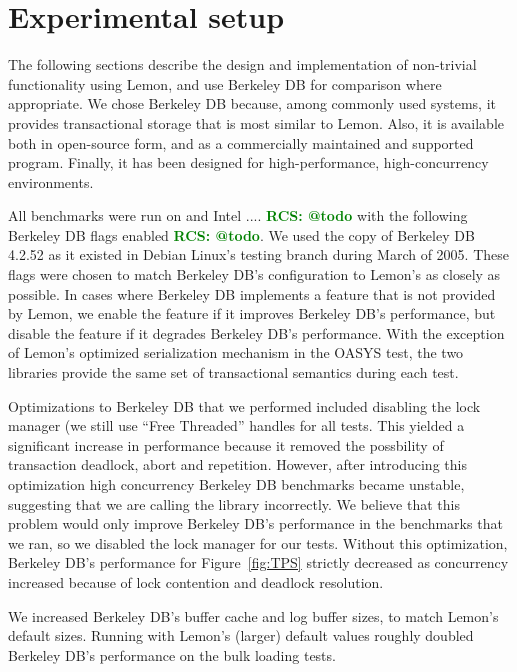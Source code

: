 \documentclass[letterpaper,twocolumn,english]{article}
\newcommand{\yad}{Lemon\xspace}
\newcommand{\rcs}[1]{\textcolor{green}{\bf RCS: #1}}
\begin{document}


\section{Experimental setup}

The following sections describe the design and implementation of
non-trivial functionality using \yad, and use Berkeley DB for
comparison where appropriate.  We chose Berkeley DB because, among
commonly used systems, it provides transactional storage that is most
similar to \yad.  Also, it is available both in open-source form, and as a
commercially maintained and supported program.  Finally, it has been 
designed for high-performance, high-concurrency environments.

All benchmarks were run on and Intel .... \rcs{@todo} with the
following Berkeley DB flags enabled \rcs{@todo}.  We used the copy
of Berkeley DB 4.2.52 as it existed in Debian Linux's testing
branch during March of 2005.  These flags were chosen to match 
Berkeley DB's configuration to \yad's as closely as possible.  In cases where
Berkeley DB implements a feature that is not provided by \yad, we
enable the feature if it improves Berkeley DB's performance, but
disable the feature if it degrades Berkeley DB's performance.  With 
the exception of \yad's optimized serialization mechanism in the 
OASYS test, the two libraries provide the same set of transactional 
semantics during each test.  

Optimizations to Berkeley DB that we performed included disabling the
lock manager (we still use ``Free Threaded'' handles for all tests.
This yielded a significant increase in performance because it removed
the possbility of transaction deadlock, abort and repetition.
However, after introducing this optimization high concurrency Berkeley
DB benchmarks became unstable, suggesting that we are calling the
library incorrectly.  We believe that this problem would only improve
Berkeley DB's performance in the benchmarks that we ran, so we
disabled the lock manager for our tests.  Without this optimization,
Berkeley DB's performance for Figure~\ref{fig:TPS} strictly decreased as
concurrency increased because of lock contention and deadlock resolution.

We increased Berkeley DB's buffer cache and log buffer sizes, to match
\yad's default sizes.  Running with \yad's (larger) default values
roughly doubled Berkeley DB's performance on the bulk loading tests.
\end{document}
